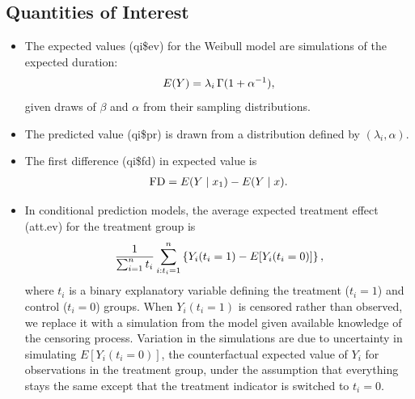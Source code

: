 \documentclass[letterpaper,10pt,english]{sphinxmanual}
\begin{document}
\subsection{Quantities of Interest}
\label{vignette:id73}\begin{itemize}
\item {} 
The expected values (qi\$ev) for the Weibull model are simulations of
the expected duration:
\begin{gather}
\begin{split}E(Y) = \lambda_i \, \Gamma (1 + \alpha^{-1}),\end{split}\notag
\end{gather}
given draws of \(\beta\) and \(\alpha\) from their sampling
distributions.

\item {} 
The predicted value (qi\$pr) is drawn from a distribution defined by
\((\lambda_i, \alpha)\).

\item {} 
The first difference (qi\$fd) in expected value is
\begin{gather}
\begin{split}\textrm{FD} = E(Y \mid x_1) - E(Y \mid x).\end{split}\notag
\end{gather}
\item {} 
In conditional prediction models, the average expected treatment
effect (att.ev) for the treatment group is
\begin{gather}
\begin{split}\frac{1}{\sum_{i=1}^n t_i}\sum_{i:t_i=1}^n \left\{ Y_i(t_i=1) -
      E[Y_i(t_i=0)] \right\},\end{split}\notag
\end{gather}
where \(t_i\) is a binary explanatory variable defining the
treatment (\(t_i=1\)) and control (\(t_i=0\)) groups. When
\(Y_i(t_i=1)\) is censored rather than observed, we replace it
with a simulation from the model given available knowledge of the
censoring process. Variation in the simulations are due to
uncertainty in simulating \(E[Y_i(t_i=0)]\), the counterfactual
expected value of \(Y_i\) for observations in the treatment
group, under the assumption that everything stays the same except
that the treatment indicator is switched to \(t_i=0\).


\end{itemize}
\end{document}
